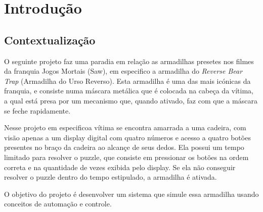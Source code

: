 \chapter{Introdução}
\label{chap:introducao}
\section{Contextualização}
  O seguinte projeto faz uma paradia em relação as armadilhas presetes nos filmes da franquia Jogos Mortais (Saw), em especifico a armadilha do \textit{Reverse Bear Trap} (Armadilha do Urso Reverso). 
Esta armadilha é uma das mais icónicas da franquia, e consiste numa máscara metálica que é colocada na cabeça da vítima, a qual está presa por um mecanismo que, quando ativado, faz com que a máscara se feche rapidamente. 
 
  Nesse projeto em especificoa vítima se encontra amarrada a uma cadeira, com visão apenas a um display digital com quatro números e acesso a quatro botões presentes no braço da cadeira ao alcançe de seus dedos. Ela possui um tempo limitado para resolver o puzzle, que consiste em pressionar os botões na ordem correta e na quantidade de vezes exibida pelo display. Se ela não conseguir resolver o puzzle dentro do tempo estipulado, a armadilha é ativada. 

O objetivo do projeto é desenvolver um sistema que simule essa armadilha usando conceitos de automação e controle.

